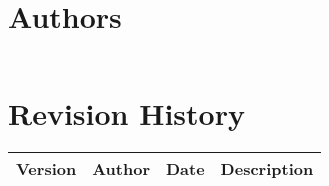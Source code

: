 \section*{Authors}

\begin{tabular}{L{} L{}}
\end{tabular}

\section*{Revision History}
\begin{longtable}{L{} L{} L{} L{}}
	\textbf{Version} & \textbf{Author}       & \textbf{Date} & \textbf{Description}                                                                                                                                                                                                       \\ \endhead
			
	\toprule
	\bottomrule
\end{longtable}